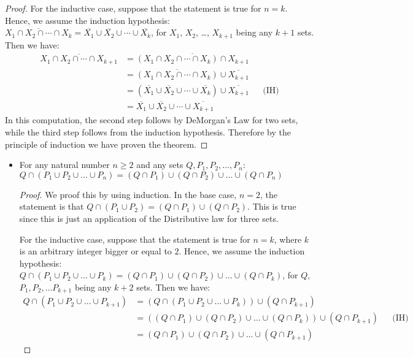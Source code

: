 \begin{solutions}
\begin{proof}
		For the inductive case, suppose that the statement is true for $n=k$. Hence, we assume the induction hypothesis: $\overline{X_1\cap X_2\cap \cdots \cap X_{k}}=\overline{X_1}\cup\overline{X_2}\cup\cdots\cup\overline{X_{k}}$,
		for $X_1$, $X_2$,
		\dots, $X_{k+1}$ being any $k+1$ sets. Then we have:
		\begin{align*}
		\overline{X_1\cap X_2\cap \cdots \cap X_{k+1}}
		&= \overline{(X_1\cap X_2\cap \cdots \cap X_k) \cap X_{k+1}}\\
		&= \overline{(X_1\cap X_2\cap \cdots \cap X_k)}\cup\overline{X_{k+1}}\\
		&= (\overline{X_1}\cup\overline{X_2}\cup\cdots\cup\overline{X_k})\cup\overline{X_{k+1}}&&\text{(IH)}\\
		&= \overline{X_1}\cup\overline{X_2}\cup\cdots\cup\overline{X_{k+1}}
		\end{align*}
		In this computation, the second step follows by DeMorgan's Law for
		two sets, while the third step follows from the induction hypothesis. Therefore by the principle of induction we have
		proven the theorem.
	\end{proof}

	\solution\begin{itemize}
		\item For any natural number $n\geq 2$ and any sets $Q, P_1, P_2,\ldots, P_n$: $Q\cap (P_1\cup P_2\cup \ldots \cup P_n)=(Q\cap P_1)\cup (Q\cap P_2)\cup\ldots\cup (Q\cap P_n)$\begin{proof}
			We proof this by using induction. In the base case, $n=2$, the statement is that $Q\cap (P_1\cup P_2)=(Q\cap P_1)\cup (Q\cap P_2)$. This is true since this is just an application of the Distributive law for three sets.

			For the inductive case, suppose that the statement is true for $n=k$, where $k$ is an arbitrary integer bigger or equal to $2$. Hence, we assume the induction hypothesis: $Q\cap (P_1\cup P_2\cup \ldots \cup P_k)=(Q\cap P_1)\cup (Q\cap P_2)\cup\ldots\cup (Q\cap P_k)$, for $Q$, $P_1, P_2,\ldots P_{k+1}$ being any $k+2$ sets. Then we have:
			\begin{align*}
				Q\cap (P_1\cup P_2\cup \ldots \cup P_{k+1})&=(Q\cap (P_1\cup P_2\cup \ldots\cup P_k))\cup (Q\cap P_{k+1})\\
				&=((Q\cap P_1)\cup (Q\cap P_2)\cup\ldots\cup (Q\cap P_k))\cup (Q\cap P_{k+1})&&\text{(IH)}\\
				&=(Q\cap P_1)\cup (Q\cap P_2)\cup\ldots\cup (Q\cap P_{k+1})
			\end{align*}


\end{proof}
\end{itemize}
\end{solutions}
